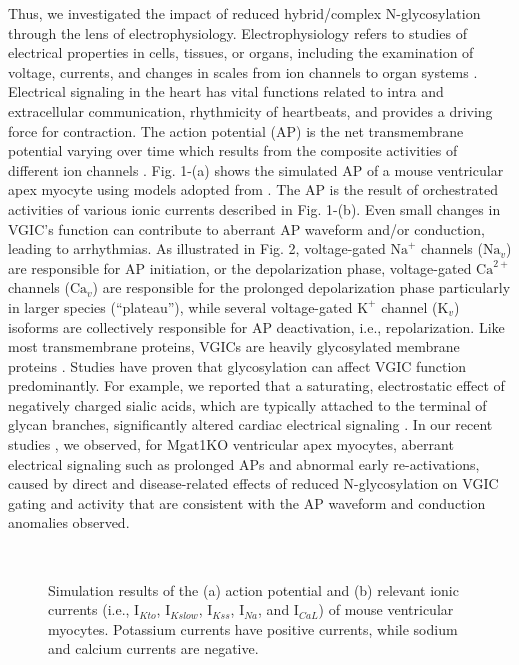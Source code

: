 \documentclass[journal]{IEEEtran}
\begin{document}
Thus, we investigated the impact of reduced hybrid/complex N-glycosylation through the lens of electrophysiology. Electrophysiology refers to studies of electrical properties in cells, tissues, or organs, including the examination of voltage, currents, and changes in scales from ion channels to organ systems \cite{scanziani2009electrophysiology}. Electrical signaling in the heart has vital functions related to intra and extracellular communication, rhythmicity of heartbeats, and provides a driving force for contraction. The action potential (AP) is the net transmembrane potential varying over time which results from the composite activities of different ion channels \cite{grant2009cardiac}. Fig. 1-(a) shows the simulated AP of a mouse ventricular apex myocyte using models adopted from \cite{bondarenko2004computer}. The AP is the result of orchestrated activities of various ionic currents described in Fig. 1-(b). Even small changes in VGIC's function can contribute to aberrant AP waveform and/or conduction, leading to arrhythmias. As illustrated in Fig. 2, voltage-gated $\text{Na}^{+}$ channels ($\text{Na}_{v}$) are responsible for AP initiation, or the depolarization phase, voltage-gated $\text{Ca}^{2+}$ channels ($\text{Ca}_{v}$) are responsible for the prolonged depolarization phase particularly in larger species (“plateau”), while several voltage-gated $\text{K}^{+}$ channel ($\text{K}_{v}$) isoforms are collectively responsible for AP deactivation, i.e., repolarization. Like most transmembrane proteins, VGICs are heavily glycosylated membrane proteins \cite{ednie2011modulation}. Studies have proven that glycosylation can affect VGIC function predominantly. For example, we reported that a saturating, electrostatic effect of negatively charged sialic acids, which are typically attached to the terminal of glycan branches, significantly altered cardiac electrical signaling \cite{ednie2013expression, ednie2015reduced}. In our recent studies \cite{ednie2019reduced, ednie2019reduced2}, we observed, for Mgat1KO ventricular apex myocytes, aberrant electrical signaling such as prolonged APs and abnormal early re-activations, caused by direct and disease-related effects of reduced N-glycosylation on VGIC gating and activity that are consistent with the AP waveform and conduction anomalies observed.
\begin{figure}
    \label{fig1}
    \centering
    \\
    \caption{Simulation results of the (a) action potential and (b) relevant ionic currents (i.e., $\text{I}_{Kto}$, $\text{I}_{Kslow}$, $\text{I}_{Kss}$, $\text{I}_{Na}$, and $\text{I}_{CaL}$) of mouse ventricular myocytes. Potassium currents have positive currents, while sodium and calcium currents are negative.}
\end{figure}
\end{document}
